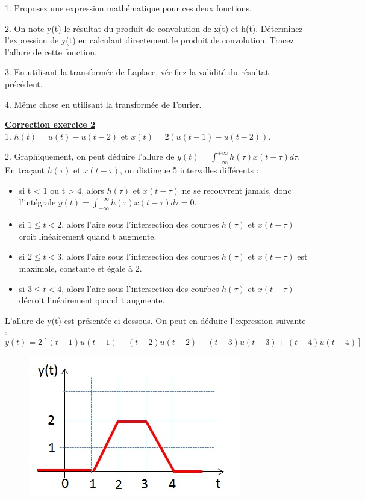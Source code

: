\documentclass[11pt]{report}
\begin{document}
	1. Proposez une expression mathématique pour ces deux fonctions.
	
	2. On note y(t) le résultat du produit de convolution de x(t) et h(t). Déterminez l'expression de y(t) en calculant directement le produit de convolution. Tracez l'allure de cette fonction.
	
	3. En utilisant la transformée de Laplace, vérifiez la validité du résultat précédent.
	
	4. Même chose en utilisant la transformée de Fourier.
	
	\vspace{1\baselineskip}
	
	\textbf{\underline{Correction exercice 2}}\\
	
	1. $h(t)=u(t)-u(t-2)$ et $x(t)=2(u(t-1)-u(t-2))$.
	
	2. Graphiquement, on peut déduire l'allure de $y(t)=\int_{-\infty}^{+\infty}h(\tau)x(t-\tau)d\tau$. En traçant $h(\tau)$ et $x(t-\tau)$, on distingue 5 intervalles différents :
	\begin{itemize}
		\item si t < 1 ou t > 4, alors $h(\tau)$ et $x(t-\tau)$ ne se recouvrent jamais, donc l'intégrale $y(t)=\int_{-\infty}^{+\infty}h(\tau)x(t-\tau)d\tau = 0$.
		\item si $1 \leq t<2$, alors l'aire sous l'intersection des courbes $h(\tau)$ et $x(t-\tau)$ croit linéairement quand t augmente.
		\item si $2 \leq t < 3$, alors l'aire sous l'intersection des courbes $h(\tau)$ et $x(t-\tau)$ est maximale, constante et égale à 2.
		\item si $3 \leq t < 4$,  alors l'aire sous l'intersection des courbes $h(\tau)$ et $x(t-\tau)$ décroit linéairement quand t augmente.
	\end{itemize}
	
	L'allure de y(t) est présentée ci-dessous. On peut en déduire l'expression suivante :
	\begin{equation*}
	y(t)=2[(t-1)u(t-1)-(t-2)u(t-2)-(t-3)u(t-3)+(t-4)u(t-4)]
	\end{equation*}
	\begin{figure}[h!]
		\centering
		\includegraphics[scale=0.6]{images/Courbes_TD_Convolution_2_Solution.jpg} 
	\end{figure}
\end{document}
